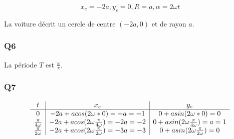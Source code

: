 \documentclass[]{book}
\theoremstyle{definition}
\begin{document}
$$x_c = -2a, y_c = 0, R = a, \alpha = 2 \omega t$$

La voiture d\'ecrit un cercle de centre $(-2a,0)$ et de rayon $a$.


\subsubsection*{Q6}
La p\'eriode $T$ est $\frac{\omega}{\pi}$.

\subsubsection*{Q7}
$$
\begin{array}{c | c | c}
  t & x_c & y_c  \\
  \hline
  0 & -2a + a cos(2 \omega * 0) = -a = -1 & 0 + a
  sin(2 \omega * 0) = 0\\
  \frac{\pi}{4 \omega}  & -2a + a cos(2 \omega  \frac{\pi}{4 \omega})
  = -2a = -2 & 0 + a
  sin(2 \omega \frac{\pi}{4 \omega}) = a = 1\\
  \frac{\pi}{2 \omega}  & -2a + a cos(2 \omega  \frac{\pi}{2 \omega})
  = -3a = -3 & 0 + a
  sin(2 \omega \frac{\pi}{2 \omega}) = 0  \\
\end{array}
$$
\end{document}
